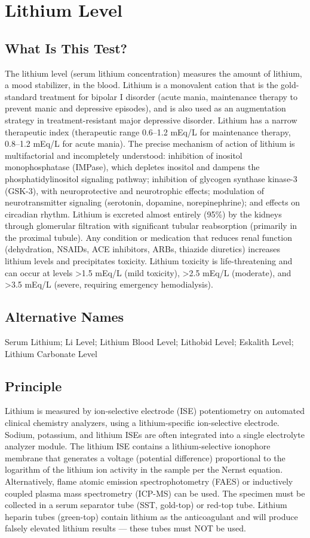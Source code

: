 \chapter{Lithium Level}

\section*{What Is This Test?}
The lithium level (serum lithium concentration) measures the amount of lithium, a mood stabilizer, in the blood. Lithium is a monovalent cation that is the gold-standard treatment for bipolar I disorder (acute mania, maintenance therapy to prevent manic and depressive episodes), and is also used as an augmentation strategy in treatment-resistant major depressive disorder. Lithium has a narrow therapeutic index (therapeutic range 0.6--1.2 mEq/L for maintenance therapy, 0.8--1.2 mEq/L for acute mania). The precise mechanism of action of lithium is multifactorial and incompletely understood: inhibition of inositol monophosphatase (IMPase), which depletes inositol and dampens the phosphatidylinositol signaling pathway; inhibition of glycogen synthase kinase-3 (GSK-3), with neuroprotective and neurotrophic effects; modulation of neurotransmitter signaling (serotonin, dopamine, norepinephrine); and effects on circadian rhythm. Lithium is excreted almost entirely (95\%) by the kidneys through glomerular filtration with significant tubular reabsorption (primarily in the proximal tubule). Any condition or medication that reduces renal function (dehydration, NSAIDs, ACE inhibitors, ARBs, thiazide diuretics) increases lithium levels and precipitates toxicity. Lithium toxicity is life-threatening and can occur at levels >1.5 mEq/L (mild toxicity), >2.5 mEq/L (moderate), and >3.5 mEq/L (severe, requiring emergency hemodialysis).

\section*{Alternative Names}
Serum Lithium; Li Level; Lithium Blood Level; Lithobid Level; Eskalith Level; Lithium Carbonate Level

\section*{Principle}
Lithium is measured by ion-selective electrode (ISE) potentiometry on automated clinical chemistry analyzers, using a lithium-specific ion-selective electrode. Sodium, potassium, and lithium ISEs are often integrated into a single electrolyte analyzer module. The lithium ISE contains a lithium-selective ionophore membrane that generates a voltage (potential difference) proportional to the logarithm of the lithium ion activity in the sample per the Nernst equation. Alternatively, flame atomic emission spectrophotometry (FAES) or inductively coupled plasma mass spectrometry (ICP-MS) can be used. The specimen must be collected in a serum separator tube (SST, gold-top) or red-top tube. Lithium heparin tubes (green-top) contain lithium as the anticoagulant and will produce falsely elevated lithium results --- these tubes must NOT be used.

